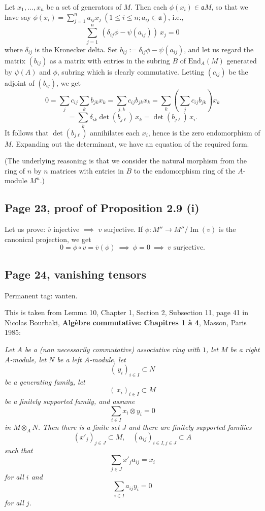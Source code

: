 \documentclass[parskip=half,fontsize=12pt]{scrartcl}%
\newcommand{\oo}{\operatorname}\newcommand{\ooo}{\operatorname*}
\newcommand{\mf}{\mathfrak}
\newcommand{\aaa}{\mf a}
\begin{document}
Let $x_1,\dots,x_n$ be a set of generators of $M$. Then each $\phi(x_i)\in\aaa M$, so that we have say $\phi(x_i)=\sum_{j=1}^na_{ij}x_j\ (1\le i\le n; a_{ij}\in\aaa)$, i.e., 
$$
\sum_{j=1}^n\ (\delta_{ij}\phi-\psi(a_{ij}))\ x_j=0
$$ 
where $\delta_{ij}$ is the Kronecker delta. Set $b_{ij}:=\delta_{ij}\phi-\psi(a_{ij})$, and let us regard the matrix $(b_{ij})$ as a matrix with entries in the subring $B$ of $\text{End}_A(M)$ generated by $\psi(A)$ and $\phi$, subring which is clearly commutative. Letting $(c_{ij})$ be the adjoint of $(b_{ij})$, we get 
$$
0=\sum_jc_{ij}\sum_kb_{jk}x_k=\sum_{j,k}c_{ij}b_{jk}x_k=\sum_k\left(\sum_jc_{ij}b_{jk}\right)x_k
$$ 
$$
=\sum_k\delta_{ik}\det(b_{j\ell})\,x_k=\det(b_{j\ell})\,x_i.
$$ %
It follows that $\det(b_{j\ell})$ annihilates each $x_i$, hence is the zero endomorphism of $M$. Expanding out the determinant, we have an equation of the required form.

(The underlying reasoning is that we consider the natural morphism from the ring of $n$ by $n$ matrices with entries in $B$ to the endomorphism ring of the $A$-module $M^n$.)

\subsection{Page 23, proof of Proposition 2.9 (i)}%

Let us prove: $\overline v$ injective $\implies$ $v$ surjective. If $\phi:M''\to M''/\oo{Im}(v)$ is the canonical projection, we get 
$$
0=\phi\circ v=\overline v(\phi)\ \implies\ \phi=0\ \implies\ v\text{ surjective.}
$$

\subsection{Page 24, vanishing tensors}\label{vt}%

Permanent tag: vanten.

This is taken from Lemma 10, Chapter 1, Section 2, Subsection 11, page 41 in Nicolas Bourbaki, \textbf{Algèbre commutative: Chapitres 1 à 4}, Masson, Paris 1985:

\emph{Let $A$ be a (non necessarily commutative) associative ring with $1$, let $M$ be a right $A$-module, let $N$ be a left $A$-module, let 
$$
(\,y_i)_{i\in I}\subset N
$$ 
be a generating family, let 
$$
(\,x_i)_{i\in I}\subset M
$$ 
be a finitely supported family, and assume 
$$
\sum_{i\in I}x_i\otimes y_i=0
$$ 
in $M\otimes_AN$. Then there is a finite set $J$ and there are finitely supported families 
$$
(x'_j)_{j\in J}\subset M,\quad(a_{ij})_{i\in I,j\in J}\subset A
$$ 
such that 
$$
\sum_{j\in J} x'_ja_{ij}=x_i
$$ 
for all $i$ and 
$$
\sum_{i\in I}a_{ij}y_i=0
$$ 
for all $j$.}
\end{document}
